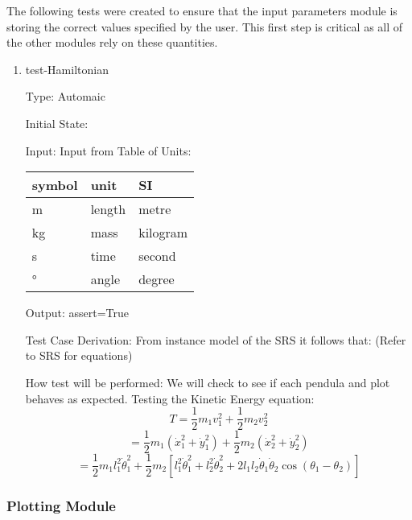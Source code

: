 \documentclass[12pt, titlepage]{article}
\begin{document}
The following tests were created to ensure that the input parameters module is 
storing the correct values specified by the user. This first step is critical 
as all of the other modules rely on these quantities.

\begin{enumerate}				
	\item{test-Hamiltonian\\}
	
	Type: Automaic
	
	Initial State: 
	
	Input: Input from Table of Units:\\
  \noindent \begin{tabular}{l l l} 
    \toprule		
    \textbf{symbol} & \textbf{unit} & \textbf{SI}\\
    \midrule 
    \si{\metre} & length & metre\\
    \si{\kilogram} & mass & kilogram\\
    \si{\second} & time & second\\
    \si{\degree} & angle & degree\\
    \bottomrule
  \end{tabular}
	
	Output: assert=True
	
	Test Case Derivation: From instance model of the SRS it follows that:
	(Refer to SRS for equations)
	
	How test will be performed: We will check to see if each pendula and plot behaves as expected.
	Testing the Kinetic Energy equation:
	$$ T = \displaystyle\frac{1}{2}m_1v_1^2 + \frac{1}{2}m_2v_2^2 $$
$$ = \frac{1}{2}m_1(\dot{x}_1^2 + \dot{y}_1^2) + \frac{1}{2}m_2(\dot{x}_2^2 +
\dot{y}_2^2) $$
$$ = \frac{1}{2}m_1 l_1^2 \dot{\theta}_1^2 + \frac{1}{2}m_2\left[l_1^2
\dot{\theta}_1^2 + l_2^2 \dot{\theta}_2^2 + 2l_1l_2\dot{\theta}_1\dot{\theta}_2
\cos(\theta_1 - \theta_2)\right]$$
			
\end{enumerate} 
		
\subsubsection{Plotting Module} 
\end{document}
